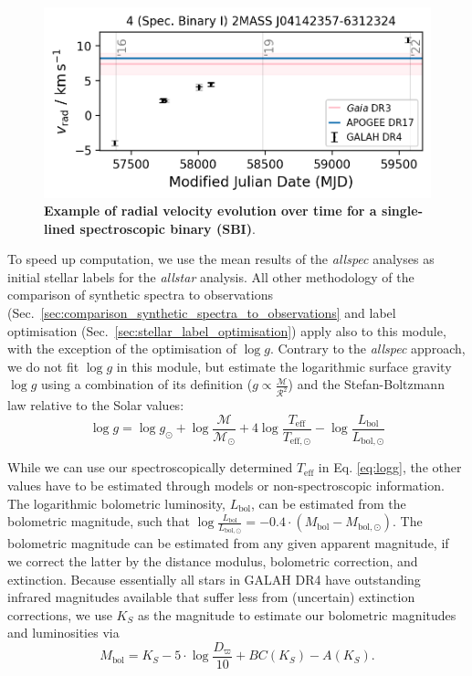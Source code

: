\documentclass[
  journal=pasa,
  manuscript=research-paper, %
  year=2023,
  volume=37
]{cup-journal}
\newcommand{\logg}{$\log g$\xspace}
\begin{document}
\begin{figure}[ht]
 \centering
 \includegraphics[width=\textwidth]{figures/examples_flag_sp_2.png}
 \caption{\textbf{Example of radial velocity evolution over time for a single-lined spectroscopic binary (SBI)}.}
 \label{fig:examples_flag_sp_2}
\end{figure}

To speed up computation, we use the mean results of the \textit{allspec} analyses as initial stellar labels for the \textit{allstar} analysis. All other methodology of the comparison of synthetic spectra to observations (Sec.~\ref{sec:comparison_synthetic_spectra_to_observations} and label optimisation (Sec.~\ref{sec:stellar_label_optimisation}) apply also to this module, with the exception of the optimisation of \logg. Contrary to the \textit{allspec} approach, we do not fit \logg in this module, but estimate the logarithmic surface gravity $\log g$ using a combination of its definition ($g \propto \frac{\mathcal{M}}{\mathcal{R}^2}$) and the Stefan-Boltzmann law relative to the Solar values:
\begin{equation}
\log g = \log g_\odot + \log \frac{\mathcal{M}}{\mathcal{M_\odot}} + 4 \log \frac{T_\mathrm{eff}}{T_\mathrm{eff,\odot}} - \log \frac{L_\mathrm{bol}}{L_\mathrm{bol,\odot}} \label{eq:logg}
\end{equation}

While we can use our spectroscopically determined $T_\mathrm{eff}$ in Eq. \ref{eq:logg}, the other values have to be estimated through models or non-spectroscopic information. The logarithmic bolometric luminosity, $L_\mathrm{bol}$, can be estimated from the bolometric magnitude, such that $\log \frac{L_\mathrm{bol}}{L_\mathrm{bol,\odot}} = -0.4 \cdot \left(M_\mathrm{bol} - M_\mathrm{bol,\odot} \right)$. The bolometric magnitude can be estimated from any given apparent magnitude, if we correct the latter by the distance modulus, bolometric correction, and extinction. Because essentially all stars in GALAH DR4 have outstanding infrared magnitudes available that suffer less from (uncertain) extinction corrections, we use $K_S$ as the magnitude to estimate our bolometric magnitudes and luminosities via
\begin{equation}
M_\mathrm{bol} = K_S - 5\cdot \log \frac{D_\varpi}{10} + BC(K_S) - A(K_S). \label{eq:mbol}
\end{equation}
\end{document}
